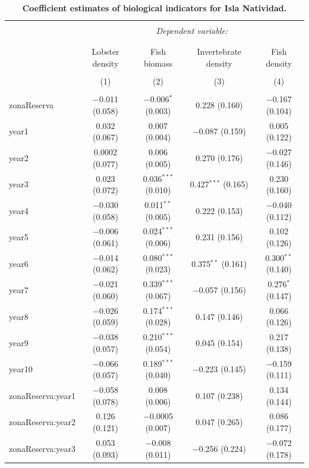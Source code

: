 \documentclass[10pt]{article}
\begin{document}
\begin{table}[h] \centering 
  \caption{{\bf Coefficient estimates of biological indicators for Isla Natividad.}} 
  \label{} 
\small 
\begin{tabular}{@{\extracolsep{1pt}}lcccc} 
\\[-1.8ex]\hline 
\hline \\[-1.8ex] 
 & \multicolumn{4}{c}{\textit{Dependent variable:}} \\ 
\cline{2-5} 
\\[-1.8ex] & \multicolumn{4}{c}{} \\ 
 & Lobster density & Fish biomass & Invertebrate density & Fish density \\ 
\\[-1.8ex] & (1) & (2) & (3) & (4)\\ 
\hline \\[-1.8ex] 
 zonaReserva & $-$0.011 (0.058) & $-$0.006$^{*}$ (0.003) & 0.228 (0.160) & $-$0.167 (0.104) \\ 
  year1 & 0.032 (0.067) & 0.007 (0.004) & $-$0.087 (0.159) & 0.005 (0.122) \\ 
  year2 & 0.0002 (0.077) & 0.006 (0.005) & 0.270 (0.176) & $-$0.027 (0.146) \\ 
  year3 & 0.023 (0.072) & 0.036$^{***}$ (0.010) & 0.427$^{***}$ (0.165) & 0.230 (0.160) \\ 
  year4 & $-$0.030 (0.058) & 0.011$^{**}$ (0.005) & 0.222 (0.153) & $-$0.040 (0.112) \\ 
  year5 & $-$0.006 (0.061) & 0.024$^{***}$ (0.006) & 0.231 (0.156) & 0.102 (0.126) \\ 
  year6 & $-$0.014 (0.062) & 0.080$^{***}$ (0.023) & 0.375$^{**}$ (0.161) & 0.300$^{**}$ (0.140) \\ 
  year7 & $-$0.021 (0.060) & 0.339$^{***}$ (0.067) & $-$0.057 (0.156) & 0.276$^{*}$ (0.147) \\ 
  year8 & $-$0.026 (0.059) & 0.174$^{***}$ (0.028) & 0.147 (0.146) & 0.066 (0.126) \\ 
  year9 & $-$0.038 (0.057) & 0.210$^{***}$ (0.054) & 0.045 (0.154) & 0.217 (0.138) \\ 
  year10 & $-$0.066 (0.057) & 0.189$^{***}$ (0.040) & $-$0.223 (0.145) & $-$0.159 (0.111) \\ 
  zonaReserva:year1 & $-$0.058 (0.078) & 0.008 (0.006) & 0.107 (0.238) & 0.134 (0.144) \\ 
  zonaReserva:year2 & 0.126 (0.121) & $-$0.0005 (0.007) & 0.047 (0.265) & 0.086 (0.177) \\ 
  zonaReserva:year3 & 0.053 (0.093) & $-$0.008 (0.011) & $-$0.256 (0.224) & $-$0.072 (0.178) \\ 

\end{tabular}
\end{table}
\end{document}

